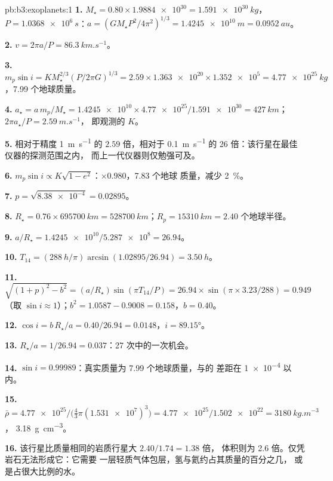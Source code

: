 \begin{solution}{pb:b3:exoplanets:1}
\textbf{1.} $M_\star = 0.80\times\num{1.9884e30} = \qty{1.591e30}{kg}$，$P =
\qty{1.0368e6}{s}$：$a = (GM_\star P^2/4\pi^2)^{1/3} = \qty{1.4245e10}{m}
= \qty{0.0952}{au}$。

\textbf{2.} $v = 2\pi a/P = \qty{86.3}{km.s^{-1}}$。

\textbf{3.} $m_p\sin i = KM_\star^{2/3}(P/2\pi G)^{1/3} = 2.59\times\num{1.363e20}
\times\num{1.352e5} = \qty{4.77e25}{kg}$，\num{7.99} 个地球质量。

\textbf{4.} $a_\star = a\,m_p/M_\star = \num{1.4245e10}\times\num{4.77e25}/
\num{1.591e30} = \qty{427}{km}$；$2\pi a_\star/P = \qty{2.59}{m.s^{-1}}$，
即观测的 $K$。

\textbf{5.} 相对于精度 \qty{1}{m.s^{-1}} 的 $2.59$ 倍，相对于
\qty{0.1}{m.s^{-1}} 的 26 倍：该行星在最佳仪器的探测范围之内，
而上一代仪器则仅勉强可及。

\textbf{6.} $m_p\sin i \propto K\sqrt{1 - e^2}$：$\times0.980$，7.83 个地球
质量，减少 \qty{2}{\percent}。

\textbf{7.} $p = \sqrt{\num{8.38e-4}} = 0.02895$。

\textbf{8.} $R_\star = 0.76\times\qty{695700}{km} = \qty{528700}{km}$；$R_p =
\qty{15310}{km} = 2.40$ 个地球半径。

\textbf{9.} $a/R_\star = \num{1.4245e10}/\num{5.287e8} = 26.94$。

\textbf{10.} $T_{14} = (\qty{288}{h}/\pi)\arcsin(1.02895/26.94) = \qty{3.50}{h}$。

\textbf{11.} $\sqrt{(1 + p)^2 - b^2} = (a/R_\star)\sin(\pi T_{14}/P) = 26.94\times
\sin(\pi\times3.23/288) = 0.949$（取 $\sin i \approx 1$）；$b^2 =
1.0587 - 0.9008 = 0.158$，$b = 0.40$。

\textbf{12.} $\cos i = b\,R_\star/a = 0.40/26.94 = 0.0148$，$i = \ang{89.15}$。

\textbf{13.} $R_\star/a = 1/26.94 = 0.037$：27 次中的一次机会。

\textbf{14.} $\sin i = 0.99989$：真实质量为 7.99 个地球质量，与的
差距在 \num{1e-4} 以内。

\textbf{15.} $\bar\rho = \num{4.77e25}/\bigl(\tfrac43\pi(\num{1.531e7})^3\bigr) =
\num{4.77e25}/\num{1.502e22} = \qty{3180}{kg.m^{-3}}$，
\qty{3.18}{g.cm^{-3}}。

\textbf{16.} 该行星比质量相同的岩质行星大 $2.40/1.74 = 1.38$ 倍，
体积则为 2.6 倍。仅凭岩石无法形成它：它需要
一层轻质气体包层，氢与氦约占其质量的百分之几，
或是占很大比例的水。


\end{solution}
